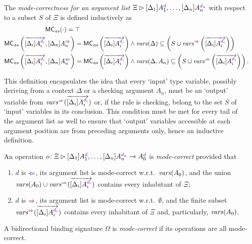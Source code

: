 \begin{definition}\label{def:mode-correctness}
  The \emph{mode-correctness for an argument list} $\Xi \rhd [\Delta_{1}] A_{1}^{\dir{d}}, \ldots, [\Delta_n]A_{n}^{\dir{d_n}}$  with respect to a subset $S$ of $\Xi$ is defined inductively as
  \begin{align}
    \label{eq:MC1} \MC_{\mathit{as}}( \cdot ) ={} & \top \\
    \label{eq:MC2} \MC_{\mathit{as}}\left(\overrightarrow{[\Delta_i]A_i^{\dir{d_i}}}, [\Delta_{n}]A_{n}^{\syn}\right) 
    & = \MC_{\mathit{as}}\left(\overrightarrow{[\Delta_i]A_i^{\dir{d_i}}}\right)
    \land \fv(\Delta) \subseteq \left( S \cup \synvar\left(\overrightarrow{[\Delta_i]A_i^{\dir{d_i}}}\right) \right)\\
    \label{eq:MC3} \MC_{\mathit{as}}\left(\overrightarrow{[\Delta_i]A_i^{\dir{d_i}}}, [\Delta_{n}]A_{n}^{\chk}\right)
    & = \MC_{\mathit{as}}\left(\overrightarrow{[\Delta_i]A_i^{\dir{d_i}}}\right)
    \land \fv(\Delta, A_n) \subseteq \left( S \cup \synvar\left(\overrightarrow{[\Delta_i]A_i^{\dir{d_i}}}\right)\right).
  \end{align}
\end{definition}
This definition encapsulates the idea that every `input' type variable, possibly deriving from a context $\Delta$ or a checking argument $A_n$, must be an `output' variable from $\synvar(\overrightarrow{[\Delta_i]A_i^{\dir{d_i}}})$ or, if the rule is checking, belong to the set $S$ of `input' variables in its conclusion.
This condition must be met for every tail of the argument list as well to ensure that `output' variables accessible at each argument position are from preceding arguments only, hence an inductive definition.
\begin{definition}
  An operation $o\colon \Xi \rhd [\Delta_{1}] A_{1}^{\dir{d}}, \ldots, [\Delta_n]A_{n}^{\dir{d_n}} \to A_0^{\dir{d}}$ is \emph{mode-correct} provided that
  \begin{enumerate}
    \item $d$ is $\chk$, its argument list is mode-correct w.r.t.\ $\mathit{vars}(A_0)$, and the union $\fv(A_0) \cup \synvar(\overrightarrow{[\Delta_i]A_i^{\dir{d_i}}})$ contains every inhabitant of $\Xi$;
    \item $d$ is $\syn$, its argument list is mode-correct w.r.t.\ $\emptyset$, and the finite subset $\synvar(\overrightarrow{[\Delta_i]A_i^{\dir{d_i}}})$ contains every inhabitant of $\Xi$ and, particularly, $\mathit{vars}(A_0)$.
  \end{enumerate}
  A bidirectional binding signature $\Omega$ is \emph{mode-correct} if its operations are all mode-correct.
\end{definition}
